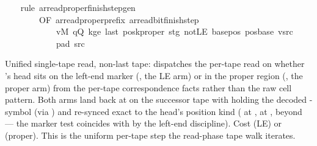 \begin{isabellebody}
%
\isadelimproof
\ \ %
\endisadelimproof
%
\isatagproof
{}\isamarkupfalse%
\ {\isacharparenleft}{\kern0pt}rule\ ar{\isacharunderscore}{\kern0pt}read{\isacharunderscore}{\kern0pt}proper{\isacharunderscore}{\kern0pt}finish{\isacharunderscore}{\kern0pt}step{\isacharunderscore}{\kern0pt}gen\isanewline
\ \ \ \ \ \ \ \ {\isacharbrackleft}{\kern0pt}OF\ ar{\isacharunderscore}{\kern0pt}read{\isacharunderscore}{\kern0pt}proper{\isacharunderscore}{\kern0pt}prefix\ ar{\isacharunderscore}{\kern0pt}read{\isacharunderscore}{\kern0pt}bit{\isacharunderscore}{\kern0pt}finish{\isacharunderscore}{\kern0pt}step\isanewline
\ \ \ \ \ \ \ \ \ \ \ \ vM\ qQ\ kge{}\ last\ posk{\isacharunderscore}{\kern0pt}proper\ stg\ notLE\ base{\isacharunderscore}{\kern0pt}pos\ pos{\isacharunderscore}{\kern0pt}base\ vsrc\isanewline
\ \ \ \ \ \ \ \ \ \ \ \ pad{}\ src{}{\isacharbrackright}{\kern0pt}{\isacharparenright}{\kern0pt}%
\endisatagproof
{\isafoldproof}%
%
\isadelimproof
%
\endisadelimproof
%
\begin{isamarkuptext}%
Unified single-tape read, non-last tape: dispatches the per-tape
  read on whether 's head sits on the left-end marker
  (, the LE arm) or in the proper region (,
  the proper arm) from the per-tape correspondence facts rather than the
  raw cell pattern.  Both arms land back at  on the
  successor tape with  holding the decoded -symbol
   (via ) and 
  re-synced exact to the head's position kind ( at
  ,  at ,
   beyond — the marker test
   coincides with  by the
  left-end discipline).  Cost  (LE) or  (proper).
  This is the uniform per-tape step the read-phase tape walk iterates.%
\end{isamarkuptext}\isamarkuptrue%
%
\begin{isamarkuptext}%

\end{isamarkuptext}
\end{isabellebody}
